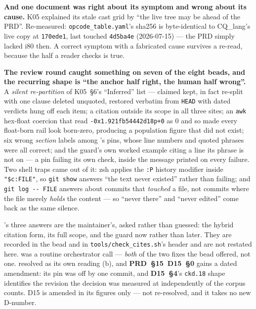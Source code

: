 \medskip
\noindent\textbf{And one document was right about its symptom and wrong about
its cause.} K05 explained its stale cast grid by ``the live tree may be ahead of
the PRD''. Re-measured: \texttt{opcode\_table.yaml}'s sha256 is byte-identical to
CQ\_lang's live copy at \texttt{170ede1}, last touched \texttt{4d5ba4e}
(2026-07-15) --- the PRD simply lacked i80 then. A correct symptom with a
fabricated cause survives a re-read, because the half a reader checks is true.

\medskip
\noindent\textbf{The review round caught something on seven of the eight beads,
and the recurring shape is ``the anchor half right, the human half wrong''.} A
\emph{silent re-partition} of K05~§6's ``Inferred'' list --- claimed kept, in
fact re-split with one clause deleted unquoted, restored verbatim from
\texttt{HEAD} with dated verdicts hung off each item; a citation outside its
scope in all three  sites; an \texttt{awk} hex-float coercion that read
\texttt{-0x1.921fb54442d18p+0} as 0 and so made every float-born rail look
born-zero, producing a population figure that did not exist; six wrong
\emph{section} labels among 's pins, whose line numbers and quoted
phrases were all correct; and the guard's own worked example citing a line its
phrase is not on --- a pin failing its own check, inside the message printed on
every failure. Two shell traps came out of it: zsh applies the \texttt{:P}
history modifier inside \texttt{"\$c:FILE"}, so \texttt{git show} answers ``the
text never existed'' rather than failing; and \texttt{git log -{}- FILE} answers
about commits that \emph{touched} a file, not commits where the file merely
\emph{holds} the content --- so ``never there'' and ``never edited'' come back as
the same silence.

's three answers are the maintainer's, asked rather than guessed: the
hybrid citation form, its full scope, and the guard now rather than later. They
are recorded in the bead and in \texttt{tools/check\_cites.sh}'s header and are
not restated here.  was a routine orchestrator call --- \emph{both} of
the two fixes the bead offered, not one.  resolved as its own reading
(b), and \textbf{PRD~§15~D15~§0} gains a dated amendment: its pin was off by one
commit, and \textbf{D15~§4}'s \texttt{ckd.18} shape identifies the revision the
decision was measured at independently of the corpus counts. D15 is amended in
its figures only --- not re-resolved, and it takes no new D-number.

